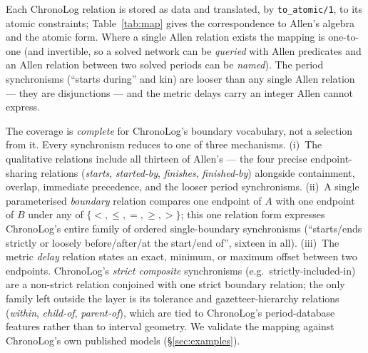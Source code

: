 \documentclass[a4paper,USenglish,cleveref,autoref,thm-restate]{oasics-v2021}
\begin{document}
Each ChronoLog relation is stored as data and translated, by
\texttt{to\_atomic/1}, to its atomic constraints; Table~\ref{tab:map}
gives the correspondence to Allen's algebra and the atomic form. Where a
single Allen relation exists the mapping is one-to-one (and invertible,
so a solved network can be \emph{queried} with Allen predicates and an
Allen relation between two solved periods can be \emph{named}). The
period synchronisms (``starts during'' and kin) are looser than any
single Allen relation --- they are disjunctions --- and the metric
delays carry an integer Allen cannot express.

The coverage is \emph{complete} for ChronoLog's boundary vocabulary,
not a selection from it. Every synchronism reduces to one of three
mechanisms. (i)~The qualitative relations include all thirteen of
Allen's --- the four precise endpoint-sharing relations
(\textit{starts}, \textit{started-by}, \textit{finishes},
\textit{finished-by}) alongside containment, overlap, immediate
precedence, and the looser period synchronisms. (ii)~A single
parameterised \emph{boundary} relation compares one endpoint of $A$
with one endpoint of $B$ under any of $\{<, \leq, =, \geq, >\}$; this
one relation form expresses ChronoLog's entire family of ordered
single-boundary synchronisms (``starts/ends strictly or loosely
before/after/at the start/end of'', sixteen in all). (iii)~The metric
\emph{delay} relation states an exact, minimum, or maximum offset
between two endpoints. ChronoLog's \emph{strict composite} synchronisms
(e.g.\ strictly-included-in) are a non-strict relation conjoined with
one strict boundary relation; the only family left outside the layer is
its tolerance and gazetteer-hierarchy relations (\textit{within},
\textit{child-of}, \textit{parent-of}), which are tied to ChronoLog's
period-database features rather than to interval geometry. We validate
the mapping against ChronoLog's own published models
(§\ref{sec:examples}).
\end{document}
